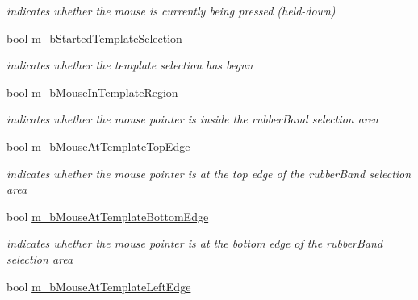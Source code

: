 \begin{CompactItemize}
\begin{CompactList}\small\item\em indicates whether the mouse is currently being pressed (held-down) \item\end{CompactList}\item 
\hypertarget{classImgLabel_45fe85b4d6b6da14b556c13284624145}{
bool \hyperlink{classImgLabel_45fe85b4d6b6da14b556c13284624145}{m\_\-bStartedTemplateSelection}}
\label{classImgLabel_45fe85b4d6b6da14b556c13284624145}

\begin{CompactList}\small\item\em indicates whether the template selection has begun \item\end{CompactList}\item 
\hypertarget{classImgLabel_990abf371f11243a65aa323bfad1cf10}{
bool \hyperlink{classImgLabel_990abf371f11243a65aa323bfad1cf10}{m\_\-bMouseInTemplateRegion}}
\label{classImgLabel_990abf371f11243a65aa323bfad1cf10}

\begin{CompactList}\small\item\em indicates whether the mouse pointer is inside the rubberBand selection area \item\end{CompactList}\item 
\hypertarget{classImgLabel_d4858784cd8aa7a53f948bb42ae7b996}{
bool \hyperlink{classImgLabel_d4858784cd8aa7a53f948bb42ae7b996}{m\_\-bMouseAtTemplateTopEdge}}
\label{classImgLabel_d4858784cd8aa7a53f948bb42ae7b996}

\begin{CompactList}\small\item\em indicates whether the mouse pointer is at the top edge of the rubberBand selection area \item\end{CompactList}\item 
\hypertarget{classImgLabel_6d005e4bb487858c70d4d14564e4a095}{
bool \hyperlink{classImgLabel_6d005e4bb487858c70d4d14564e4a095}{m\_\-bMouseAtTemplateBottomEdge}}
\label{classImgLabel_6d005e4bb487858c70d4d14564e4a095}

\begin{CompactList}\small\item\em indicates whether the mouse pointer is at the bottom edge of the rubberBand selection area \item\end{CompactList}\item 
\hypertarget{classImgLabel_921c1163775a86236d44d84e11172177}{
bool \hyperlink{classImgLabel_921c1163775a86236d44d84e11172177}{m\_\-bMouseAtTemplateLeftEdge}}
\label{classImgLabel_921c1163775a86236d44d84e11172177}


\end{CompactItemize}
